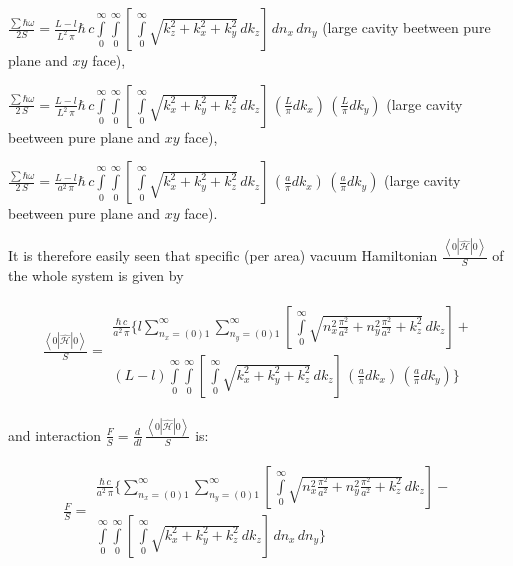 \documentclass[11pt]{article}
\begin{document}
\(\frac{\sum\hbar\omega}{2 S} = \frac{L-l}{L^2\,\pi}\hbar\,c\int\limits_{0}^{\infty}\int\limits_{0}^{\infty}\left[\,\int\limits_{0}^{\infty}\sqrt{k_z^2+k_x^2+k_y^2}\,dk_z\right]\,dn_x\,dn_y\)
(large cavity beetween pure plane and \(xy\) face),

\(\frac{\sum\hbar\omega}{2\,S} = \frac{L-l}{L^2\,\pi}\hbar\,c\int\limits_{0}^{\infty}\int\limits_{0}^{\infty}\left[\,\int\limits_{0}^{\infty}\sqrt{k_x^2+k_y^2+k_z^2}\,dk_z\right]\,\left(\frac{L}{\pi}dk_x\right)\,\left(\frac{L}{\pi}dk_y\right)\)
(large cavity beetween pure plane and \(xy\) face),

\(\frac{\sum\hbar\omega}{2\,S} = \frac{L-l}{a^2\,\pi}\hbar\,c\int\limits_{0}^{\infty}\int\limits_{0}^{\infty}\left[\,\int\limits_{0}^{\infty}\sqrt{k_x^2+k_y^2+k_z^2}\,dk_z\right]\,\left(\frac{a}{\pi}dk_x\right)\,\left(\frac{a}{\pi}dk_y\right)\)
(large cavity beetween pure plane and \(xy\) face).

    It is therefore easily seen that specific (per area) vacuum Hamiltonian
\(\frac{\left<0|\hat{\mathcal{H}}|0\right>}{S}\) of the whole system is
given by

\[\begin{array}{lr}
\frac{\left<0|\hat{\mathcal{H}}|0\right>}{S} =
\begin{array}{c}\frac{\hbar\,c}{a^2\,\pi}\Bigg\{l\sum\limits_{n_x=(0)1}^{\infty}\sum\limits_{n_y=(0)1}^{\infty}\left[\,\int\limits_{0}^{\infty}\sqrt{n_x^2\frac{\pi^2}{a^2}+n_y^2\frac{\pi^2}{a^2}+k_z^2}\,dk_z\right] + \\
(L-l)\int\limits_{0}^{\infty}\int\limits_{0}^{\infty}\left[\,\int\limits_{0}^{\infty}\sqrt{k_x^2+k_y^2+k_z^2}\,dk_z\right]\,\left(\frac{a}{\pi}dk_x\right)\,\left(\frac{a}{\pi}dk_y\right)\Bigg\}
\end{array}\end{array}\]

and interaction
\(\frac{F}{S} = \frac{d}{dl} \,\frac{\left<0|\hat{\mathcal{H}}|0\right>}{S}\)
is:

\[\begin{array}{lr}\frac{F}{S} =
\begin{array}{c}\frac{\hbar\,c}{a^2\,\pi}\Bigg\{\sum\limits_{n_x=(0)1}^{\infty}\sum\limits_{n_y=(0)1}^{\infty}\left[\,\int\limits_{0}^{\infty}\sqrt{n_x^2\frac{\pi^2}{a^2}+n_y^2\frac{\pi^2}{a^2}+k_z^2}\,dk_z\right] - \\
\int\limits_{0}^{\infty}\int\limits_{0}^{\infty}\left[\,\int\limits_{0}^{\infty}\sqrt{k_x^2+k_y^2+k_z^2}\,dk_z\right]\,dn_x\,dn_y\Bigg\}\end{array}\end{array}\]
\end{document}
